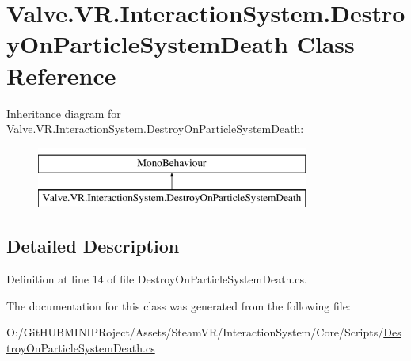 \hypertarget{class_valve_1_1_v_r_1_1_interaction_system_1_1_destroy_on_particle_system_death}{}\section{Valve.\+V\+R.\+Interaction\+System.\+Destroy\+On\+Particle\+System\+Death Class Reference}
\label{class_valve_1_1_v_r_1_1_interaction_system_1_1_destroy_on_particle_system_death}
Inheritance diagram for Valve.\+V\+R.\+Interaction\+System.\+Destroy\+On\+Particle\+System\+Death\+:\begin{figure}[H]
\begin{center}
\leavevmode
\includegraphics[height=2.000000cm]{class_valve_1_1_v_r_1_1_interaction_system_1_1_destroy_on_particle_system_death}
\end{center}
\end{figure}


\subsection{Detailed Description}


Definition at line 14 of file Destroy\+On\+Particle\+System\+Death.\+cs.



The documentation for this class was generated from the following file\+:\begin{DoxyCompactItemize}
\item 
O\+:/\+Git\+H\+U\+B\+M\+I\+N\+I\+P\+Roject/\+Assets/\+Steam\+V\+R/\+Interaction\+System/\+Core/\+Scripts/\mbox{\hyperlink{_destroy_on_particle_system_death_8cs}{Destroy\+On\+Particle\+System\+Death.\+cs}}\end{DoxyCompactItemize}
